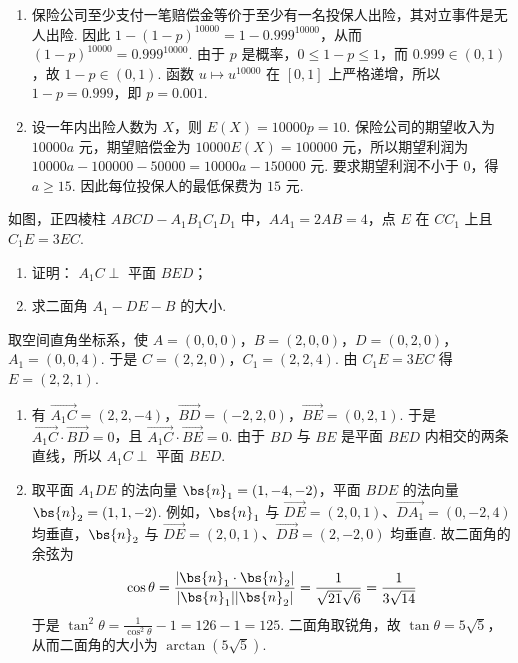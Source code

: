 \begin{solution}
\begin{enumerate}
\item 保险公司至少支付一笔赔偿金等价于至少有一名投保人出险，其对立事件是无人出险. 因此 \(1-(1-p)^{10000}=1-0.999^{10000}\)，从而 \((1-p)^{10000}=0.999^{10000}\). 由于 \(p\) 是概率，\(0\leqslant1-p\leqslant1\)，而 \(0.999\in(0,1)\)，故 \(1-p\in(0,1)\). 函数 \(u\mapsto u^{10000}\) 在 \([0,1]\) 上严格递增，所以 \(1-p=0.999\)，即 \(p=0.001\).
\item 设一年内出险人数为 \(X\)，则 \(E(X)=10000p=10\). 保险公司的期望收入为 \(10000a\) 元，期望赔偿金为 \(10000E(X)=100000\) 元，所以期望利润为 \(10000a-100000-50000=10000a-150000\) 元. 要求期望利润不小于 \(0\)，得 \(a\geqslant15\). 因此每位投保人的最低保费为 \(15\) 元.
\end{enumerate}
\end{solution}

\begin{problem}
如图，正四棱柱 \(ABCD - A_{1}B_{1}C_{1}D_{1}\) 中，\(AA_{1} = 2AB = 4\)，点 \(E\) 在 \(CC_{1}\) 上且 \(C_{1}E = 3EC\).

\begin{enumerate}
\item 证明： \(A_{1}C \perp\) 平面 \(BED\)；
\item 求二面角 \(A_{1} - DE - B\) 的大小.
\end{enumerate}

\end{problem}

\begin{solution}
取空间直角坐标系，使 \(A=(0,0,0)\)，\(B=(2,0,0)\)，\(D=(0,2,0)\)，\(A_1=(0,0,4)\). 于是 \(C=(2,2,0)\)，\(C_1=(2,2,4)\). 由 \(C_1E=3EC\) 得 \(E=(2,2,1)\).

\begin{enumerate}
\item 有 \(\overrightarrow{A_1C}=(2,2,-4)\)，\(\overrightarrow{BD}=(-2,2,0)\)，\(\overrightarrow{BE}=(0,2,1)\). 于是 \(\overrightarrow{A_1C}\cdot\overrightarrow{BD}=0\)，且 \(\overrightarrow{A_1C}\cdot\overrightarrow{BE}=0\). 由于 \(BD\) 与 \(BE\) 是平面 \(BED\) 内相交的两条直线，所以 \(A_1C\perp\) 平面 \(BED\).
\item 取平面 \(A_1DE\) 的法向量 \(\bs{n}_1=(1,-4,-2)\)，平面 \(BDE\) 的法向量 \(\bs{n}_2=(1,1,-2)\). 例如，\(\bs{n}_1\) 与 \(\overrightarrow{DE}=(2,0,1)\)、\(\overrightarrow{DA_1}=(0,-2,4)\) 均垂直，\(\bs{n}_2\) 与 \(\overrightarrow{DE}=(2,0,1)\)、\(\overrightarrow{DB}=(2,-2,0)\) 均垂直. 故二面角的余弦为
\[
\cos\theta=\frac{|\bs{n}_1\cdot\bs{n}_2|}{|\bs{n}_1||\bs{n}_2|}=\frac{1}{\sqrt{21}\sqrt{6}}=\frac{1}{3\sqrt{14}}
\]
于是 \(\tan^2\theta=\frac{1}{\cos^2\theta}-1=126-1=125\). 二面角取锐角，故 \(\tan\theta=5\sqrt{5}\)，从而二面角的大小为 \(\arctan(5\sqrt{5})\).
\end{enumerate}
\end{solution}

